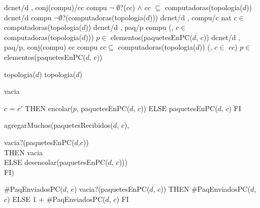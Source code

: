 \begin{tad}{}
	 {dcnet/d , conj(compu)/cc} {compu} {$\neg$ $\emptyset?$($cc$) $\wedge$ 
																	$cc$ $\subseteq$ computadoras(topologia($d$))}	
	 {dcnet/d} {compu} {$\neg\emptyset$?(computadoras(topologia($d$)))}   
	 {dcnet/d , compu/c} {nat}	{$c\in$ computadoras(topologia($d$))}							  
	 {dcnet/d , paq/p} {compu} {(, $c \in$ computadoras(topologia($d$))) $p\in$ elementos(paquetesEnPC($d$, $c$))}
	 {dcnet/d , paq/p, conj(compu) cc} {compu} {$cc \subseteq$ computadoras(topologia($d$)) \yluego (, $c \in$ $cc$) $p\in$ elementos(paquetesEnPC($d$, $c$))}


	 {topologia($d$)}
	 {topologia($d$)}

	 {vacia}

			
	 { \IF $c$ = $c'$
																	THEN encolar($p$, paquetesEnPC($d$, $c$))
																	ELSE paquetesEnPC($d$, $c$)
																	FI}	
			  {agregarMuchos(paquetesRecibidos($d$, $c$), 			  
			  
			  \hspace*{6.5em}  \IFL vacia?(paquetesEnPC($d$,$c$))\\
			  \hspace*{6.5em}  THEN vacia \\
			  \hspace*{6.5em}  ELSE desencolar(paquetesEnPC($d$, $c$)))\\
			  \hspace*{6.5em}FI)}
	
	 {\#PaqEnviadosPC($d$, $c$)}
	 { \IF vacia?(paquetesEnPC($d$, $c$))
															 THEN \#PaqEnviadosPC($d$, $c$)
															 ELSE 1 + \#PaqEnviadosPC($d$, $c$)
															 FI}	
  

\end{tad}
